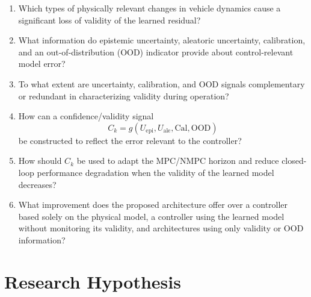 \documentclass[12pt,a4paper]{report}
\begin{document}
%
\begin{enumerate}[label=\textbf{RQ\arabic*:}]
    \item Which types of physically relevant changes in vehicle dynamics cause a significant loss of validity of the learned residual?

    \item What information do epistemic uncertainty, aleatoric uncertainty, calibration, and an out-of-distribution (OOD) indicator provide about control-relevant model error?

    \item To what extent are uncertainty, calibration, and OOD signals complementary or redundant in characterizing validity during operation?

    \item How can a confidence/validity signal
    \[C_k=g(U_{\mathrm{epi}},U_{\mathrm{ale}},\mathrm{Cal},
    \mathrm{OOD})\]
    be constructed to reflect the error relevant to the controller?

    \item How should \(C_k\) be used to adapt the MPC/NMPC horizon and reduce closed-loop performance degradation when the validity of the learned model decreases?

    \item What improvement does the proposed architecture offer over a controller based solely on the physical model, a controller using the learned model without monitoring its validity, and architectures using only validity or OOD information?

\end{enumerate}

\section{Research Hypothesis}
\end{document}
